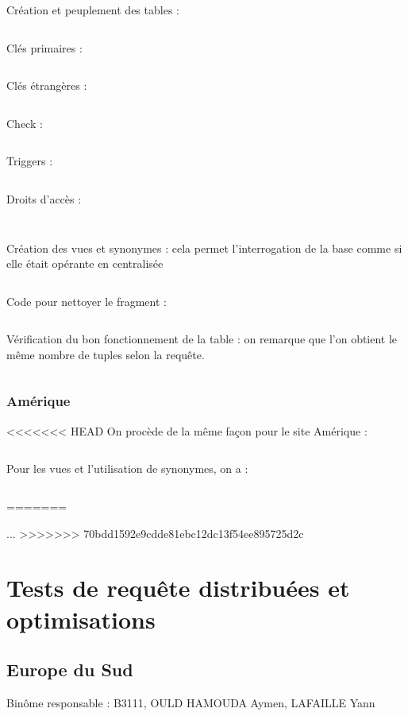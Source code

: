 \documentclass[10pt,a4paper]{article}
\theoremstyle{plain}
\begin{document}
Création et peuplement des tables :
\inputminted{sql}{EUS_III-C-3-creation_tables.sql}
\newpage

Clés primaires : 
\inputminted{sql}{EUS_III-C-5-Primary_key.sql}
\newpage

Clés étrangères :
\inputminted{sql}{EUS_III-C-5_foreign_key.sql}
\newpage

Check :
\inputminted{sql}{EUS_III-C-5_check.sql}
\newpage

Triggers : 
\inputminted{sql}{EUS_III-C-5_trigger.sql}
\newpage

Droits d'accès : 
\inputminted{sql}{EUS_III-C-6.sql}
\inputminted{sql}{EUS_III-C-6_2.sql}
\newpage

Création des vues et synonymes : cela permet l'interrogation de la base comme si elle était opérante en centralisée

\inputminted{sql}{EUS_III-C-7.sql}
\newpage

Code pour nettoyer le fragment :
\inputminted{sql}{EUS_III-C-8.sql}
\newpage

Vérification du bon fonctionnement de la table : on remarque que l'on obtient le même nombre de tuples selon la requête.
\inputminted{sql}{EUS_III-C-9.sql}
\newpage 

\subsubsection{Amérique}
<<<<<<< HEAD
On procède de la même façon pour le site Amérique :
\inputminted{sql}{AM_SFW.sql}
\newpage 

Pour les vues et l'utilisation de synonymes, on a :
\inputminted{sql}{AM_Vues.sql}
=======

...
>>>>>>> 70bdd1592e9cdde81ebc12dc13f54ee895725d2c
\newpage

\section{Tests de requête distribuées et optimisations}
\subsection{Europe du Sud}
Binôme responsable : B3111, OULD HAMOUDA Aymen, LAFAILLE Yann
\end{document}
